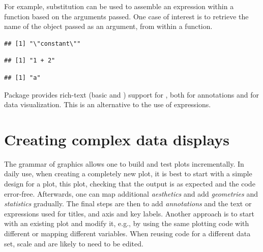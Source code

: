\documentclass[krantz2]{krantz}\usepackage{knitr}
\begin{document}
For example, substitution can be used to assemble an expression within a function based on the arguments passed. One case of interest is to retrieve the name of the object passed as an argument, from within a function.

\begin{knitrout}\footnotesize
{}\color{fgcolor}\begin{kframe}
\begin{alltt}
 \hlkwb{<-} \hlstd{(}\hlstd{) \{}
  \hlstd{(}\hlstd{(}
\hlstd{\}}

 \hlkwb{<-} 

\hlstd{(}\hlstd{)}
\end{alltt}
\begin{verbatim}
## [1] "\"constant\""
\end{verbatim}
\begin{alltt}
\hlstd{(} \hlopt{+} \hlstd{)}
\end{alltt}
\begin{verbatim}
## [1] "1 + 2"
\end{verbatim}
\begin{alltt}
\end{alltt}
\begin{verbatim}
## [1] "a"
\end{verbatim}
\end{kframe}
\end{knitrout}

Package  provides rich-text (basic  and \Markdown) support for \ggplot, both for annotations and for data visualization. This is an alternative to the use of \Rlang expressions.

\section{Creating complex data displays}\label{sec:plot:composition}

The grammar of graphics allows one to build and test plots incrementally. In daily use, when creating a completely new plot, it is best to start with a simple design for a plot,  this plot, checking that the output is as expected and the code error-free. Afterwards, one can map additional \emph{aesthetics} and add \emph{geometries} and \emph{statistics} gradually. The final steps are then to add \emph{annotations} and the text or expressions used for titles, and axis and key labels. Another approach is to start with an existing plot and modify it, e.g.,  by using the same plotting code with different  or mapping different variables. When reusing code for a different data set, scale  and  are likely to need to be edited.
\end{document}
